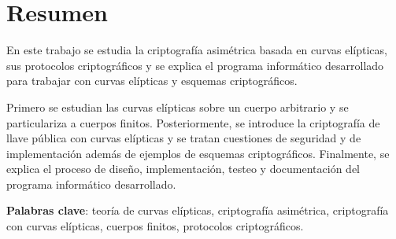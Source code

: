 \begingroup
\let\clearpage\relax
\let\cleardoublepage\relax
\let\cleardoublepage\relax

\chapter*{Resumen}


En este trabajo se estudia la criptografía asimétrica basada en curvas elípticas, sus protocolos criptográficos y se explica el programa informático desarrollado para trabajar con curvas elípticas y esquemas criptográficos.

Primero se estudian las curvas elípticas sobre un cuerpo arbitrario y se particulariza a cuerpos finitos. Posteriormente, se introduce la criptografía de llave pública con curvas elípticas y se tratan cuestiones de seguridad y de implementación además de ejemplos de esquemas criptográficos. Finalmente, se explica el proceso de diseño, implementación, testeo y documentación del programa informático desarrollado.

\bigskip

\textbf{Palabras clave}: teoría de curvas elípticas, criptografía asimétrica, criptografía con curvas elípticas, cuerpos finitos, protocolos criptográficos.

\endgroup

\vfill

